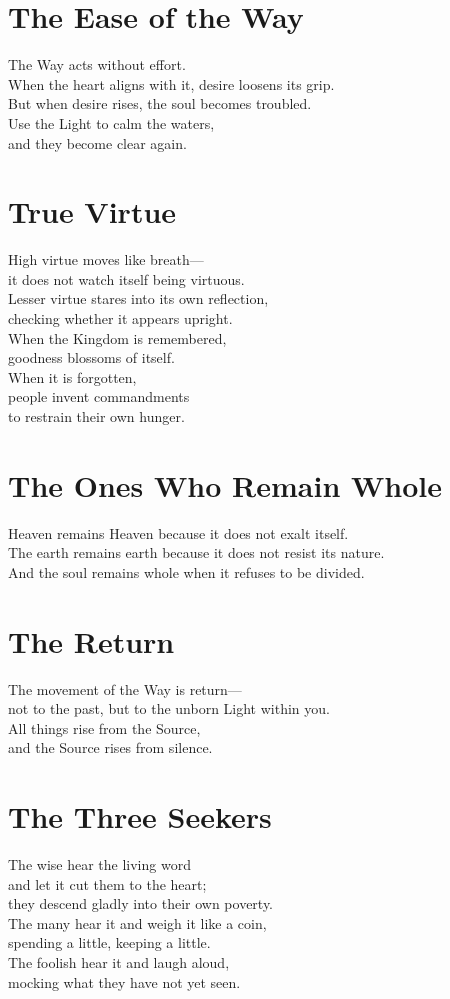 \documentclass[10pt, openright]{book}
\begin{document}
\section{The Ease of the Way}
The Way acts without effort. \\
When the heart aligns with it, desire loosens its grip. \\

But when desire rises, the soul becomes troubled. \\
Use the Light to calm the waters, \\
and they become clear again.

\section{True Virtue}
High virtue moves like breath--- \\
it does not watch itself being virtuous. \\
Lesser virtue stares into its own reflection, \\
checking whether it appears upright. \\

When the Kingdom is remembered, \\
goodness blossoms of itself. \\
When it is forgotten, \\
people invent commandments \\
to restrain their own hunger.

\section{The Ones Who Remain Whole}
Heaven remains Heaven because it does not exalt itself. \\
The earth remains earth because it does not resist its nature. \\
And the soul remains whole when it refuses to be divided.

\section{The Return}
The movement of the Way is return— \\
not to the past, but to the unborn Light within you. \\
All things rise from the Source, \\
and the Source rises from silence.

\section{The Three Seekers}
The wise hear the living word \\
and let it cut them to the heart; \\
they descend gladly into their own poverty. \\
The many hear it and weigh it like a coin, \\
spending a little, keeping a little. \\
The foolish hear it and laugh aloud, \\
mocking what they have not yet seen. \\
\end{document}
